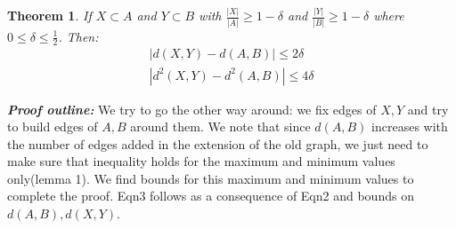 \documentclass{article}
\newtheorem{theorem}{Theorem}[]
\begin{document}
\begin{theorem}
	If $X\subset A$ and $Y\subset B$ with $\frac{|X|}{|A|}\geq  1-\delta$ and $\frac{|Y|}{|B|}\geq  1-\delta$ where $0\leq  \delta\leq \frac{1}{2}$. Then:
	\begin{align}
	|d(X,Y)-d(A,B)|\leq  2\delta\\
	|d^2(X,Y)-d^2(A,B)|\leq  4\delta
	\end{align}
\end{theorem}
\noindent\textbf{\textit{Proof outline:}} We try to go the other way around: we fix edges of $X,Y$ and try to build edges of $A,B$ around them. We note that since $d(A,B)$ increases with the number of edges added in the extension of the old graph, we just need to make sure that inequality holds for the maximum and minimum values only(lemma 1). We find bounds for this maximum and minimum values to complete the proof. Eqn3 follows as a consequence of Eqn2 and bounds on $d(A,B),d(X,Y)$.
\end{document}
